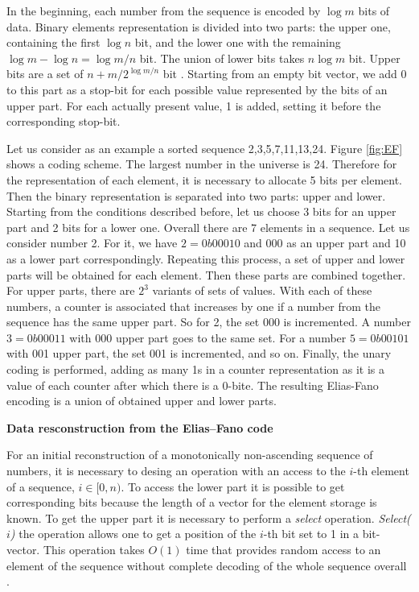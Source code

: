 In the beginning, each number from the sequence is encoded by $\log m$ bits of data.
Binary elements representation is divided into two parts: the upper one, containing
the first $\log n$ bit, and the lower one with the remaining $\log m - \log n = \log m / n$ bit.
The union of lower bits takes $n \log m$ bit. Upper bits are a set of 
$n + m / 2^{\log m/n}$ bit \cite{antonio2018integers}.
Starting from an empty bit vector, we add 0 to this part as a stop-bit
for each possible value represented by the bits of an upper part.
For each actually present value, 1 is added, setting it before the corresponding stop-bit.

Let us consider as an example a sorted sequence {2,3,5,7,11,13,24}.
Figure \ref{fig:EF} shows a coding scheme. The largest number in the universe is 24.
Therefore for the representation of each element, it is necessary to allocate 5 bits per element.
Then the binary representation is separated into two parts: upper and lower.
Starting from the conditions described before, let us choose 3 bits for an upper part and 2 bits for a lower one.
Overall there are 7 elements in a sequence. Let us consider number 2.
For it, we have $2 = 0b00010$ and 000 as an upper part and 10 as a lower part correspondingly.
Repeating this process, a set of upper and lower parts will be obtained for each element.
Then these parts are combined together. For upper parts, there are $2^3$ variants of sets of values.
With each of these numbers, a counter is associated that increases by one if a number from the sequence
has the same upper part. So for 2, the set 000 is incremented. A number $3 = 0b00011$ with 000 upper part
goes to the same set. For a number $5 = 0b00101$ with 001 upper part, the set 001 is incremented, and so on.
Finally, the unary coding is performed, adding as many 1s in a counter representation as it is a value of
each counter after which there is a 0-bite. The resulting Elias-Fano encoding is a union of obtained
upper and lower parts.

\textbf{Data resconstruction from the Elias--Fano code}

For an initial reconstruction of a monotonically non-ascending sequence of numbers, it is necessary to
desing an operation with an access to the $i$-th element of a sequence, $i \in [0, n)$.
To access the lower part it is possible to get corresponding bits because the length of a vector for
the element storage is known.
To get the upper part it is necessary to perform a \emph{select} operation. \emph{Select($i$)}
the operation allows one to get a position of the $i$-th bit set to 1 in a bit-vector.
This operation takes $O(1)$ time that provides random access to an element
of the sequence without complete decoding of the whole sequence overall \cite{farina2009rank}.
